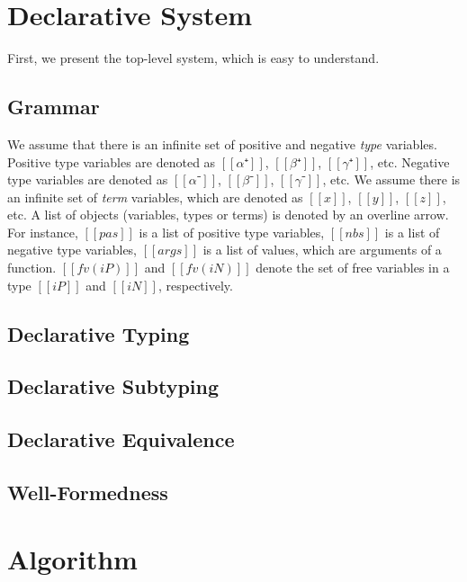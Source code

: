 \documentclass[a4,natbib=false]{article}
\begin{document}
\tableofcontents

\newpage

\section{Declarative System}
First, we present the top-level system, which is easy to understand.

\subsection{Grammar}
We assume that there is an infinite set of positive and 
negative \emph{type} variables. Positive type variables are denoted as 
$[[α⁺]]$, $[[β⁺]]$, $[[γ⁺]]$, etc.
Negative type variables are denoted as $[[α⁻]]$, $[[β⁻]]$, $[[γ⁻]]$, etc.
We assume there is an infinite set of \emph{term} variables,
which are denoted as $[[x]]$, $[[y]]$, $[[z]]$, etc.
A list of objects (variables, types or terms) is denoted by
an overline arrow. For instance, $[[pas]]$ is a list of positive type variables, 
$[[nbs]]$ is a list of negative type variables, 
$[[args]]$ is a list of values, which are arguments of a function.
$[[fv(iP)]]$ and $[[fv(iN)]]$ denote the set of free variables 
in a type $[[iP]]$ and $[[iN]]$, respectively.

\bigskip

\ottgrammartabular{
  \ottiP\ottinterrule
  \ottiN\ottinterrule
  \ottv\ottinterrule
  \ottc\ottinterrule
}

\subsection{Declarative Typing}
\ottdefnsDT

\subsection{Declarative Subtyping}
\ottdefnsDOne

\subsection{Declarative Equivalence}
\ottdefnsEOne

\subsection{Well-Formedness}
\ottdefnsWFT
\ottdefnsWFAT

\section{Algorithm}
\end{document}
